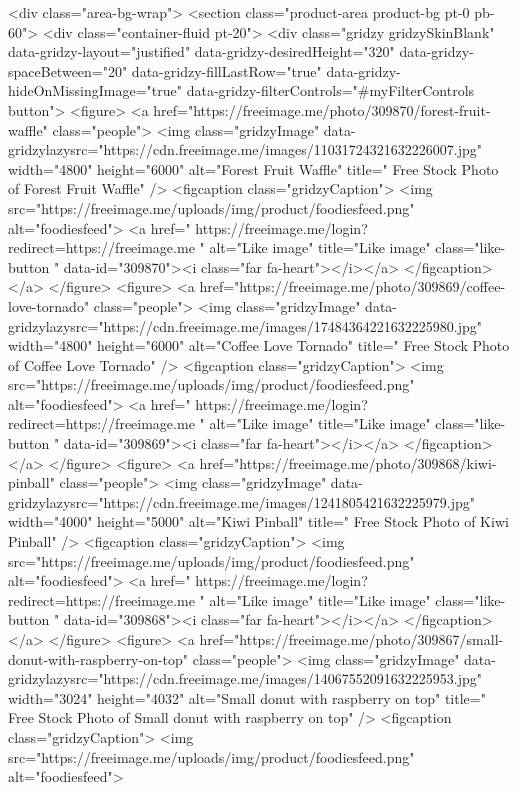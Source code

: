 <div class="area-bg-wrap">
<section class="product-area product-bg pt-0 pb-60">
<div class="container-fluid pt-20">
<div class="gridzy gridzySkinBlank" data-gridzy-layout="justified" data-gridzy-desiredHeight="320" data-gridzy-spaceBetween="20" data-gridzy-fillLastRow="true" data-gridzy-hideOnMissingImage="true" data-gridzy-filterControls="#myFilterControls button">
<figure>
<a href="https://freeimage.me/photo/309870/forest-fruit-waffle" class="people">
<img class="gridzyImage" data-gridzylazysrc="https://cdn.freeimage.me/images/11031724321632226007.jpg" width="4800" height="6000" alt="Forest Fruit Waffle" title=" Free Stock Photo of Forest Fruit Waffle" />
<figcaption class="gridzyCaption">
<img src="https://freeimage.me/uploads/img/product/foodiesfeed.png" alt="foodiesfeed">
<a href=" https://freeimage.me/login?redirect=https://freeimage.me " alt="Like image" title="Like image" class="like-button  " data-id="309870"><i class="far fa-heart"></i></a>
</figcaption>
</a>
</figure>
<figure>
<a href="https://freeimage.me/photo/309869/coffee-love-tornado" class="people">
 <img class="gridzyImage" data-gridzylazysrc="https://cdn.freeimage.me/images/17484364221632225980.jpg" width="4800" height="6000" alt="Coffee Love Tornado" title=" Free Stock Photo of Coffee Love Tornado" />
<figcaption class="gridzyCaption">
<img src="https://freeimage.me/uploads/img/product/foodiesfeed.png" alt="foodiesfeed">
<a href=" https://freeimage.me/login?redirect=https://freeimage.me " alt="Like image" title="Like image" class="like-button  " data-id="309869"><i class="far fa-heart"></i></a>
</figcaption>
</a>
</figure>
<figure>
<a href="https://freeimage.me/photo/309868/kiwi-pinball" class="people">
<img class="gridzyImage" data-gridzylazysrc="https://cdn.freeimage.me/images/1241805421632225979.jpg" width="4000" height="5000" alt="Kiwi Pinball" title=" Free Stock Photo of Kiwi Pinball" />
<figcaption class="gridzyCaption">
<img src="https://freeimage.me/uploads/img/product/foodiesfeed.png" alt="foodiesfeed">
<a href=" https://freeimage.me/login?redirect=https://freeimage.me " alt="Like image" title="Like image" class="like-button  " data-id="309868"><i class="far fa-heart"></i></a>
</figcaption>
</a>
</figure>
<figure>
<a href="https://freeimage.me/photo/309867/small-donut-with-raspberry-on-top" class="people">
<img class="gridzyImage" data-gridzylazysrc="https://cdn.freeimage.me/images/14067552091632225953.jpg" width="3024" height="4032" alt="Small donut with raspberry on top" title=" Free Stock Photo of Small donut with raspberry on top" />
<figcaption class="gridzyCaption">
<img src="https://freeimage.me/uploads/img/product/foodiesfeed.png" alt="foodiesfeed">
